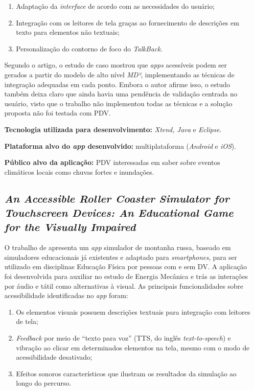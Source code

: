 \begin{enumerate}
    \item Adaptação da \emph{interface} de acordo com as necessidades do usuário;
    \item Integração com os leitores de tela graças ao fornecimento de descrições em texto para elementos não textuais;
    \item Personalização do contorno de foco do \emph{TalkBack}.
\end{enumerate}

Segundo o artigo, o estudo de caso mostrou que \emph{apps} acessíveis podem ser gerados a partir do modelo de alto nível \emph{MD²}, implementando as técnicas de integração adequadas em
cada ponto. Embora o autor afirme isso, o estudo também deixa claro que ainda havia uma pendência de validação centrada no usuário, visto que o trabalho não implementou todas as técnicas
e a solução proposta não foi testada com PDV\@.

\textbf{Tecnologia utilizada para desenvolvimento:} \emph{Xtend, Java} e \emph{Eclipse}.

\textbf{Plataforma alvo do \emph{app} desenvolvido:} multiplataforma (\emph{Android} e \emph{iOS}).

\textbf{Público alvo da aplicação:} PDV interessadas em saber sobre eventos climáticos locais como chuvas fortes e inundações.

\subsection{\emph{An Accessible Roller Coaster Simulator for Touchscreen Devices: An Educational Game for the Visually Impaired}}

O trabalho de  apresenta um \emph{app} simulador de montanha russa, baseado em simuladores educacionais já existentes e adaptado para \emph{smartphones}, para ser utilizado em disciplinas Educação Física por pessoas com e sem DV\@.
A aplicação foi desenvolvida para auxiliar no estudo de Energia Mecânica e trás as interações por áudio e tátil como alternativas à visual.
As principais funcionalidades sobre acessibilidade identificadas no \emph{app} foram:

\begin{enumerate}
    \item Os elementos visuais possuem descrições textuais para integração com leitores de tela;
    \item \emph{Feedback} por meio de ``texto para voz'' (TTS, do inglês \emph{text-to-speech}) e vibração ao clicar em determinados elementos na tela, mesmo com o modo de acessibilidade desativado;
    \item Efeitos sonoros característicos que ilustram os resultados da simulação ao longo do percurso.
\end{enumerate}


